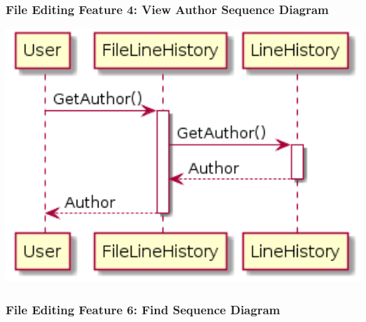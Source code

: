 \documentclass[twoside,letterpaper]{article}
\begin{document}
	\newpage
	
	\subsubsection[File Editing Feature 4: View Author Sequence Diagram]{\rmfamily\bfseries\color{black}
		File Editing Feature 4: View Author Sequence Diagram}
	\hypertarget{RefHeading22059017292}{}
	
	\bigskip
	
	\includegraphics[width=6.0in]{images/SequenceDiagrams/Author}
	
	\newpage
	
	\subsubsection[File Editing Feature 6: Find Sequence Diagram]{\rmfamily\bfseries\color{black}
		File Editing Feature 6: Find Sequence Diagram}
	\hypertarget{RefHeading22059017292}{}
	
	\bigskip
	
\end{document}
